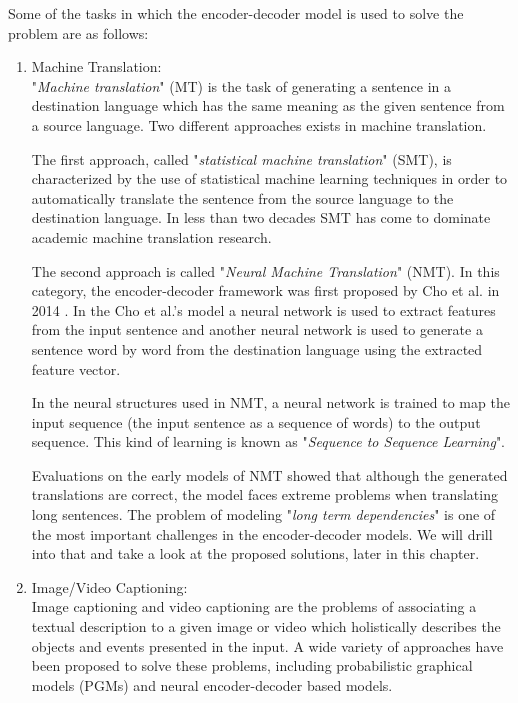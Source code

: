 \documentclass[preprint, 10pt]{elsarticle}
\begin{document}
Some of the tasks in which the encoder-decoder model is used to solve the problem are as follows:
	\begin{enumerate}
		\item Machine Translation:\\
		"\textit{Machine translation}" (MT) is the task of generating a sentence in a destination language which has the same meaning as the given sentence from a source language. Two different approaches exists in machine translation. 
		
		The first approach, called "\textit{statistical machine translation}" (SMT), is characterized by the use of statistical machine learning techniques in order to automatically translate the sentence from the source language to the destination language. In less than two decades SMT has come to dominate academic machine translation research\cite{lopez2008statistical}. 
		
		The second approach is called "\textit{Neural Machine Translation}" (NMT). In this category, the encoder-decoder framework was first proposed by Cho et al. in 2014 \cite{cho2014learning}. In the Cho et al.'s model a neural network is used to extract features from the input sentence and another neural network is used to generate a sentence word by word from the destination language using the extracted feature vector. 
		
		In the neural structures used in NMT, a neural network is trained to map the input sequence (the input sentence as a sequence of words) to the output sequence. This kind of learning is known as "\textit{Sequence to Sequence Learning}".
		
		Evaluations on the early models of NMT showed that although the generated translations are correct, the model faces extreme problems when translating long sentences\cite{cho2014properties}. The problem of modeling "\textit{long term dependencies}" is one of the most important challenges in the encoder-decoder models. We will drill into that and take a look at the proposed solutions, later in this chapter.
		
		\item Image/Video Captioning:\\
		Image captioning and video captioning are the problems of associating a textual description to a given image or video which holistically describes the objects and events presented in the input. A wide variety of approaches have been proposed to solve these problems, including probabilistic graphical models (PGMs) and neural encoder-decoder based models.
		

\end{enumerate}
\end{document}
